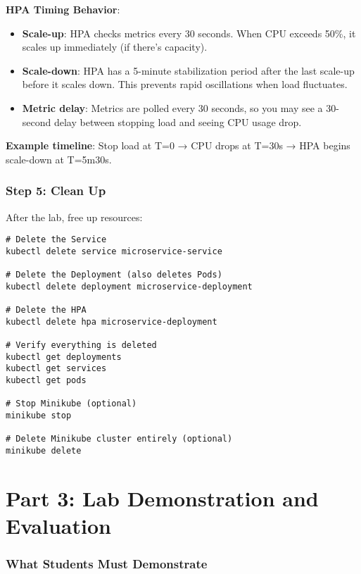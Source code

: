 \documentclass[12pt,a4paper]{article}
\begin{document}
\begin{importantbox}
\textbf{HPA Timing Behavior}:
\begin{itemize}
    \item \textbf{Scale-up}: HPA checks metrics every 30 seconds. When CPU exceeds 50\%, it scales up immediately (if there's capacity).
    \item \textbf{Scale-down}: HPA has a 5-minute stabilization period after the last scale-up before it scales down. This prevents rapid oscillations when load fluctuates.
    \item \textbf{Metric delay}: Metrics are polled every 30 seconds, so you may see a 30-second delay between stopping load and seeing CPU usage drop.
\end{itemize}
\textbf{Example timeline}: Stop load at T=0 → CPU drops at T=30s → HPA begins scale-down at T=5m30s.
\end{importantbox}

\section{Step 5: Clean Up}

After the lab, free up resources:

\begin{lstlisting}[caption=Clean up resources]
# Delete the Service
kubectl delete service microservice-service

# Delete the Deployment (also deletes Pods)
kubectl delete deployment microservice-deployment

# Delete the HPA
kubectl delete hpa microservice-deployment

# Verify everything is deleted
kubectl get deployments
kubectl get services
kubectl get pods

# Stop Minikube (optional)
minikube stop

# Delete Minikube cluster entirely (optional)
minikube delete
\end{lstlisting}

\newpage

\part{Part 3: Lab Demonstration and Evaluation}

\section{What Students Must Demonstrate}
\end{document}
